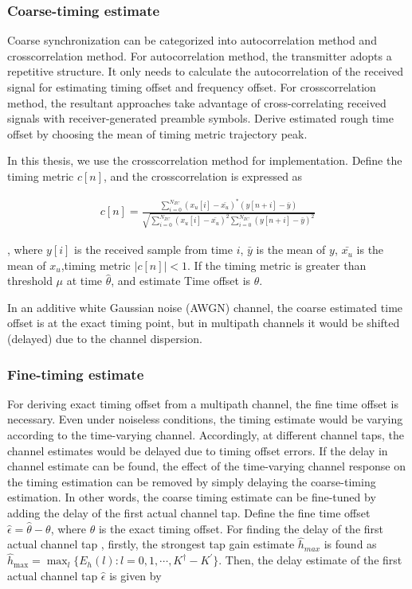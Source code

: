 \subsubsection{Coarse-timing estimate}

Coarse synchronization can be categorized into autocorrelation method and crosscorrelation method. For autocorrelation method, the transmitter adopts a repetitive structure. It only needs to calculate the autocorrelation of the received signal for estimating timing offset and frequency offset. For crosscorrelation method, the resultant approaches take advantage of cross-correlating received signals with receiver-generated preamble symbols. Derive estimated rough time offset by choosing the mean of timing metric trajectory peak.

In this thesis, we use the crosscorrelation method for implementation. Define the timing metric $c[n]$, and the crosscorrelation is expressed as

\begin{align}
c[n] = \frac{\sum_{i=0}^{N_{ZC}}(x_u[i]-\bar{x_u})^{*}(y[n+i]-\bar{y})}{\sqrt{\sum_{i=0}^{N_{ZC}}(x_u[i]-\bar{x_u})^{2}\sum_{i=0}^{N_{ZC}}(y[n+i]-\bar{y})^{2}}}
\end{align}

, where $y[i]$ is the received sample from time $i$, $\bar{y}$ is the mean of $y$, $\bar{x_u}$ is the mean of $x_u$,timing metric $|c[n]|<1$. If the timing metric is greater than threshold $\mu$ at time $\widehat{\theta}$, and estimate Time offset is $\widehat{\theta}$.

 In an additive white Gaussian noise (AWGN) channel, the coarse estimated time offset is at the exact timing point, but in multipath channels it would be shifted (delayed) due to the channel dispersion.

\subsubsection{Fine-timing estimate}

For deriving exact timing offset from a multipath channel, the fine time offset is necessary. Even under noiseless conditions, the timing estimate would be varying according to the time-varying channel. Accordingly, at different channel taps, the channel estimates would be delayed due to timing offset errors. If the delay in channel estimate can be found, the effect of the time-varying channel response on the timing estimation can be removed by simply delaying the coarse-timing estimation. In other words, the coarse timing estimate can be fine-tuned by adding the delay of the first actual channel tap. Define the fine time offset $\hat{\epsilon} =  \hat{\theta} - \theta$, where $\theta$ is the exact timing offset. For finding the delay of the first actual channel tap \cite{minn2003robust}, firstly, the strongest tap gain estimate $\hat{h}_{max}$ is found as $\hat{h}_{\text{max}} = \max_{l} \{ E_h(l) : l = 0, 1 , \cdots, K^{\dag}-K^{\prime} \} $. Then, the delay estimate of the first actual channel tap $\hat{\epsilon}$ is given by

